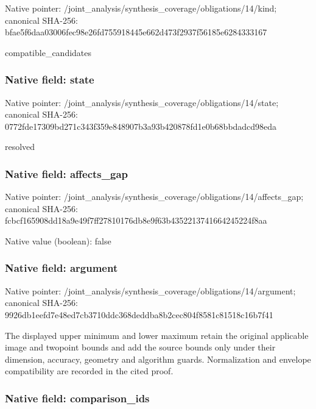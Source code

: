 \documentclass[10pt,a4paper]{article}
\begin{document}
Native pointer: /joint\_analysis/synthesi\allowbreak{}s\_coverage/obligations/1\allowbreak{}4/kind; canonical SHA-256: bfae5f6daa03006fec98e26f\allowbreak{}d755918445e662d473f2937f\allowbreak{}56185e6284333167


compatible\_candidates


\subsubsection{Native field: state}


Native pointer: /joint\_analysis/synthesi\allowbreak{}s\_coverage/obligations/1\allowbreak{}4/state; canonical SHA-256: 0772fde17309bd271c343f35\allowbreak{}9e848907b3a93b420878fd1e\allowbreak{}0b68bbdadcd98eda


resolved


\subsubsection{Native field: affects\_gap}


Native pointer: /joint\_analysis/synthesi\allowbreak{}s\_coverage/obligations/1\allowbreak{}4/affects\_gap; canonical SHA-256: fcbcf165908dd18a9e49f7ff\allowbreak{}27810176db8e9f63b4352213\allowbreak{}741664245224f8aa



Native value (boolean): false



\subsubsection{Native field: argument}


Native pointer: /joint\_analysis/synthesi\allowbreak{}s\_coverage/obligations/1\allowbreak{}4/argument; canonical SHA-256: 9926db1eefd7e48ed7cb3710\allowbreak{}ddc368deddba8b2cec804f85\allowbreak{}81c81518c16b7f41


The displayed upper minimum and lower maximum retain the original applicable image and twopoint bounds and add the source bounds only under their dimension, accuracy, geometry and algorithm guards. Normalization and envelope compatibility are recorded in the cited proof.


\subsubsection{Native field: comparison\_ids}
\end{document}
